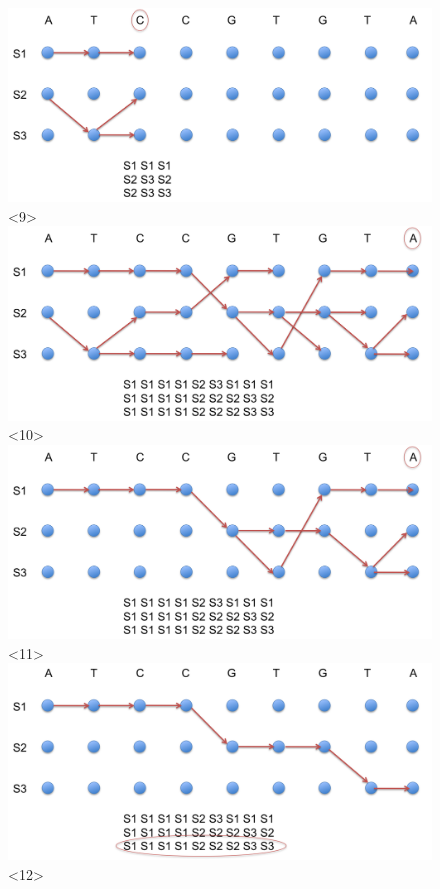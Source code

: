 \documentclass{beamer}
\begin{document}
\begin{frame}
\begin{figure}[h]
			\includegraphics[width=1.0\textwidth]{../picturesforthepresentation/Viterbi9.png}<9>
			\includegraphics[width=1.0\textwidth]{../picturesforthepresentation/Viterbi10.png}<10>
			\includegraphics[width=1.0\textwidth]{../picturesforthepresentation/Viterbi11.png}<11>
			\includegraphics[width=1.0\textwidth]{../picturesforthepresentation/Viterbi12.png}<12>			
		\end{figure}

\end{frame}
\end{document}

